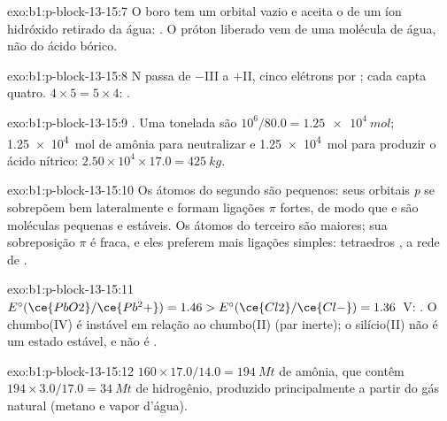 \begin{solution}{exo:b1:p-block-13-15:7}
O boro tem um orbital vazio e aceita o  de um íon
hidróxido retirado da água: . O
próton liberado vem de uma molécula de água, não do ácido bórico.
\end{solution}

\begin{solution}{exo:b1:p-block-13-15:8}
N passa de $-$III a $+$II, cinco elétrons por ; cada  capta
quatro. $4 \times 5 = 5 \times 4$: .
\end{solution}

\begin{solution}{exo:b1:p-block-13-15:9}
. Uma tonelada são $10^6/80.0 = \qty{1.25e4}{mol}$;
\qty{1.25e4}{mol} de amônia para neutralizar e \qty{1.25e4}{mol} para
produzir o ácido nítrico: $2.50 \times 10^4 \times 17.0 = \qty{425}{kg}$.
\end{solution}

\begin{solution}{exo:b1:p-block-13-15:10}
Os átomos do segundo  são pequenos: seus orbitais \textit{p} se
sobrepõem bem lateralmente e formam ligações $\pi$ fortes, de modo que
 e  são moléculas pequenas e estáveis. Os átomos do
terceiro  são maiores; sua sobreposição $\pi$ é fraca, e eles
preferem mais ligações simples: tetraedros , a rede de .
\end{solution}

\begin{solution}{exo:b1:p-block-13-15:11}
$E^\circ(\ce{PbO2}/\ce{Pb^2+}) = 1.46 > E^\circ(\ce{Cl2}/\ce{Cl-}) = 1.36$~V:
. O chumbo(IV) é instável em
relação ao chumbo(II) (par inerte); o silício(II) não é um estado estável,
e  não é .
\end{solution}

\begin{solution}{exo:b1:p-block-13-15:12}
$160 \times 17.0/14.0 = \qty{194}{Mt}$ de amônia, que contêm $194 \times
3.0/17.0 = \qty{34}{Mt}$ de hidrogênio, produzido principalmente a partir
do gás natural (metano e vapor d'água).
\end{solution}

